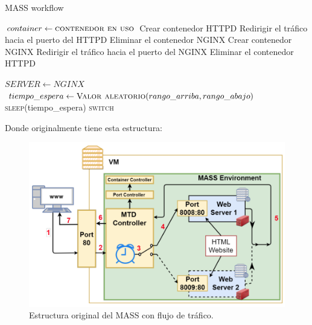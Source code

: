 \begin{algorithm}[H]
\caption{MASS workflow}\label{mass:algorithm}
    \begin{algorithmic}[1]
            \State $container \gets \textsc{contenedor en uso}$
                \State Crear contenedor HTTPD
                \State Redirigir el tráfico hacia el puerto del HTTPD
                \State Eliminar el contenedor NGINX
            \Else
                    \State Crear contenedor NGINX
                    \State Redirigir el tráfico hacia el puerto del NGINX
                    \State Eliminar el contenedor HTTPD
                \EndIf
            \EndIf
        \EndFunction

            \State $SERVER \gets NGINX$
                \State $tiempo\_espera \gets \textsc{Valor aleatorio}(rango\_arriba , rango\_abajo)$
                \State \textsc{sleep}(tiempo\_espera)
                \State \textsc{switch}
            \EndWhile
        \EndFunction
    \end{algorithmic}
\end{algorithm}

Donde originalmente tiene esta estructura:
\begin{figure}[H]
    \centering
    \includegraphics[width=\linewidth]{./imagenes/mass-structure.png}
    \caption{Estructura original del MASS con flujo de tráfico.\cite{MTD-DARE-DIM-MASS}}
\end{figure}

